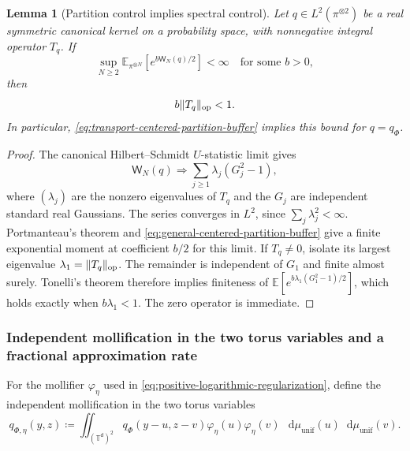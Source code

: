 \documentclass[11pt,reqno]{amsart}
\numberwithin{equation}{section}
\theoremstyle{plain}
\newtheorem{lemma}[lemma]{Lemma}
\theoremstyle{definition}
\DeclarePairedDelimiter{\norm}{\lVert}{\rVert}
\renewcommand{\d}{\mathsf d}
\newcommand{\dd}{\mathop{}\!\mathrm d}
\newcommand{\T}{\mathbb T}
\newcommand{\E}{\mathbb E}
\newcommand{\op}{\mathrm{op}}
\newcommand{\muunif}{\mu_{\mathrm{unif}}}
\begin{document}
\begin{lemma}[Partition control implies spectral control]
\label{lem:transport-partition-implies-gap}
Let $q\in L^2(\pi^{\otimes2})$ be a real symmetric canonical kernel on a probability space, with nonnegative integral operator $T_q$. If
\begin{equation}
 \sup_{N\geq2}\E_{\pi^{\otimes N}}[e^{b\mathsf W_N(q)/2}]<\infty
 \quad\text{for some }b>0,
 \label{eq:general-centered-partition-buffer}
\end{equation}
then
\begin{equation}
 b\norm{T_q}_{\op}<1.
 \label{eq:transport-spectral-gap}
\end{equation}
In particular, \eqref{eq:transport-centered-partition-buffer} implies this bound for $q=q_\Phi$.
\end{lemma}
\begin{proof}
The canonical Hilbert--Schmidt $U$-statistic limit \cite[Section~5.5.2]{Serfling1980} gives
\begin{equation}
 \mathsf W_N(q)\Longrightarrow
 \sum_{j\geq1}\lambda_j(G_j^2-1),
 \label{eq:transport-Serfling-quadratic-limit}
\end{equation}
where $(\lambda_j)$ are the nonzero eigenvalues of $T_q$ and the $G_j$ are independent standard real Gaussians. The series converges in $L^2$, since $\sum_j\lambda_j^2<\infty$. Portmanteau's theorem and \eqref{eq:general-centered-partition-buffer} give a finite exponential moment at coefficient $b/2$ for this limit. If $T_q\ne0$, isolate its largest eigenvalue $\lambda_1=\norm{T_q}_{\op}$. The remainder is independent of $G_1$ and finite almost surely. Tonelli's theorem therefore implies finiteness of $\E[e^{b\lambda_1(G_1^2-1)/2}]$, which holds exactly when $b\lambda_1<1$. The zero operator is immediate.
\end{proof}

\subsubsection{Independent mollification in the two torus variables and a fractional approximation rate}

For the mollifier $\varphi_\eta$ used in \eqref{eq:positive-logarithmic-regularization}, define the independent mollification in the two torus variables
\begin{equation}
 q_{\Phi,\eta}(y,z)
 \coloneqq\iint_{(\T^{\d})^2}
 q_\Phi(y-u,z-v)\varphi_\eta(u)\varphi_\eta(v)
 \,\dd\muunif(u)\dd\muunif(v).
 \label{eq:transport-independent-convolution}
\end{equation}
\end{document}
